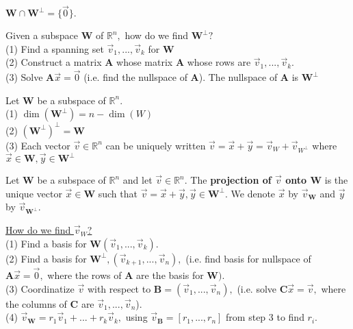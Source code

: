 \documentclass{article}
\begin{document}
\begin{theorem}
$\boldsymbol{W} \cap \boldsymbol{W}^{\perp} = \{\vec{0}\}.$
\end{theorem}

Given a subspace $\boldsymbol{W}$ of $\mathbb{R}^n,$ how do we find $\boldsymbol{W}^{\perp}?$ \\
(1) Find a spanning set $\vec{v}_1, ... , \vec{v}_k$ for $\boldsymbol{W}$ \\
(2) Construct a matrix $\boldsymbol{A}$ whose matrix $\boldsymbol{A}$ whose rows are $\vec{v}_1, ... , \vec{v}_k.$ \\
(3) Solve $\boldsymbol{A}\vec{x} = \vec{0}$ (i.e. find the nullspace of $\boldsymbol{A}$). The nullspace of $\boldsymbol{A}$ is $\boldsymbol{W}^{\perp}$

\begin{theorem}
Let $\boldsymbol{W}$ be a subspace of $\mathbb{R}^n.$ \\
(1) $\dim(\boldsymbol{W}^{\perp}) = n - \dim(W)$ \\
(2) $(\boldsymbol{W}^{\perp})^{\perp} = \boldsymbol{W}$ \\
(3) Each vector $\vec{v} \in \mathbb{R}^n$ can be uniquely written $\vec{v} = \vec{x} + \vec{y} = \vec{v}_{W} + \vec{v}_{W^{\perp}}$ where $\vec{x} \in \boldsymbol{W}, \vec{y} \in \boldsymbol{W}^{\perp}$
\end{theorem}

\begin{definition}
Let $\boldsymbol{W}$ be a subspace of $\mathbb{R}^n$ and let $\vec{v} \in \mathbb{R}^n.$ The \textbf{projection of $\vec{v}$ onto $\boldsymbol{W}$} is the unique vector $\vec{x} \in \boldsymbol{W}$ such that $\vec{v} = \vec{x} + \vec{y}, \vec{y} \in \boldsymbol{W}^{\perp}.$ We denote $\vec{x}$ by $\vec{v}_{\boldsymbol{W}}$ and $\vec{y}$ by $\vec{v}_{\boldsymbol{W}^{\perp}}.$
\end{definition}

\underline{How do we find $\vec{v}_{W}$?} \\
(1) Find a basis for $\boldsymbol{W} (\vec{v}_1, ... , \vec{v}_k).$ \\
(2) Find a basis for $\boldsymbol{W}^{\perp}, (\vec{v}_{k+1}, ... , \vec{v}_n),$ (i.e. find basis for nullspace of $\boldsymbol{A}\vec{x} = \vec{0}, $  where the rows of $\boldsymbol{A}$ are the basis for $\boldsymbol{W}).$ \\
(3) Coordinatize $\vec{v}$ with respect to $\boldsymbol{B} = (\vec{v}_1, ... , \vec{v}_n),$ (i.e. solve $\boldsymbol{C}\vec{x} = \vec{v},$ where the columns of $\boldsymbol{C}$ are $\vec{v}_1, ... , \vec{v}_n$). \\
(4) $\vec{v}_{\boldsymbol{W}} = r_1 \vec{v}_1 + ... + r_k\vec{v}_k,$ using $\vec{v}_{\boldsymbol{B}} = [r_1, ... , r_n]$ from step 3 to find $r_i.$
\end{document}
